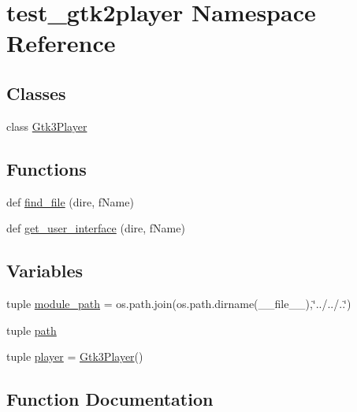 \hypertarget{namespacetest__gtk2player}{}\section{test\+\_\+gtk2player Namespace Reference}
\label{namespacetest__gtk2player}
\subsection*{Classes}
\begin{DoxyCompactItemize}
\item 
class \hyperlink{classtest__gtk2player_1_1Gtk3Player}{Gtk3\+Player}
\end{DoxyCompactItemize}
\subsection*{Functions}
\begin{DoxyCompactItemize}
\item 
def \hyperlink{namespacetest__gtk2player_a1c9b520597497613454be7df393f8c7c}{find\+\_\+file} (dire, f\+Name)
\item 
def \hyperlink{namespacetest__gtk2player_abb78cfea4fca0053faf153ac09d95e8e}{get\+\_\+user\+\_\+interface} (dire, f\+Name)
\end{DoxyCompactItemize}
\subsection*{Variables}
\begin{DoxyCompactItemize}
\item 
tuple \hyperlink{namespacetest__gtk2player_a3123a7e498effed2151b3ded5fcb6a78}{module\+\_\+path} = os.\+path.\+join(os.\+path.\+dirname(\+\_\+\+\_\+file\+\_\+\+\_\+),\char`\"{}../../..\char`\"{})
\item 
tuple \hyperlink{namespacetest__gtk2player_a6d16df350b2dec478016866eb17425d8}{path}
\item 
tuple \hyperlink{namespacetest__gtk2player_ad1b103d4f47c8574fa227972c380465b}{player} = \hyperlink{classtest__gtk2player_1_1Gtk3Player}{Gtk3\+Player}()
\end{DoxyCompactItemize}


\subsection{Function Documentation}
\hypertarget{namespacetest__gtk2player_a1c9b520597497613454be7df393f8c7c}{}
